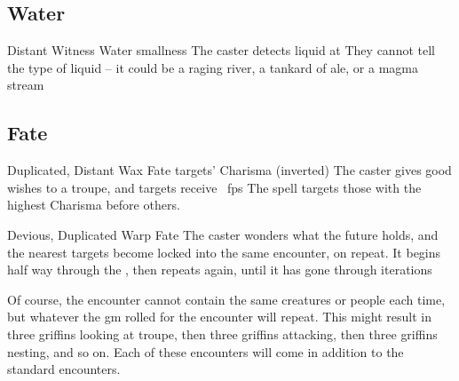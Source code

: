 \begin{multicols}{2}
{  

}{}

\subsection{Water}
\label{waterSpells}





  {Distant}%
  {Witness}%
  {Water}%
  {smallness}%
  {The caster detects liquid at \spellRange}%
  {They cannot tell the type of liquid -- it could be a raging river, a tankard of ale, or a magma stream}





\subsection{Fate}
\label{fateSpells}



  {Duplicated, Distant}%
  {Wax}%
  {Fate}%
  {targets' Charisma (inverted)}%
  {The caster gives good wishes to a troupe, and  targets receive \showDam~\glspl{fp}}%
  {The spell targets those with the highest Charisma before others.}


  {Devious, Duplicated}%
  {Warp}%
  {Fate}%
  {}%
  {The caster wonders what the future holds, and the nearest  targets become locked into the same encounter, on repeat.
  It begins half way through the \showOnset, then repeats again, until it has gone through  iterations}%
  {\par
  Of course, the encounter cannot contain the same creatures or people each time, but whatever the \gls{gm} rolled for the encounter will repeat.
  This might result in three \glspl{griffin} looking at troupe, then three \glspl{griffin} attacking, then three \glspl{griffin} nesting, and so on.
  Each of these encounters will come in addition to the standard encounters.}


\end{multicols}
